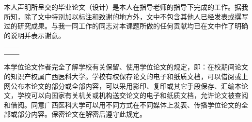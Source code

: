 本人声明所呈交的毕业论文（设计）是本人在指导老师的指导下完成的工作。据我所知，除了文中特别加以标注和致谢的地方外，文中不包含其他人已经发表或撰写过的研究成果。与我一同工作的同志对本课题所做的任何贡献均已在文中作了明确的说明并表示谢意。
\newline

\begin{table}[!h]
    \centering
    \begin{tabular*}{\textwidth}{@{\extracolsep{\fill}}ll}
	


	&\tsign{\hwrite{\asignWidth}{\ahwrite}}
	\\[13pt]
	&\signdate{\asignY}{\asignM}{\asignD}\\
\end{tabular*}
\end{table}

\noindent
{}

\vspace{26pt}
本学位论文作者完全了解学校有关保留、使用学位论文的规定，即：在校期间论文的知识产权属广西医科大学。学校有权保存论文的电子和纸质文档，可以借阅或上网公布本论文的部分或全部内容，可以采用影印、复印或其它手段保存、汇编本论文，学校可以向国家有关机关或机构送交论文的电子和纸质文档，允许论文被查阅和借阅。同意广西医科大学可以用不同方式在不同媒体上发表、传播学位论文的全部或部分内容。保密论文在解密后遵守此规定。
\newline


